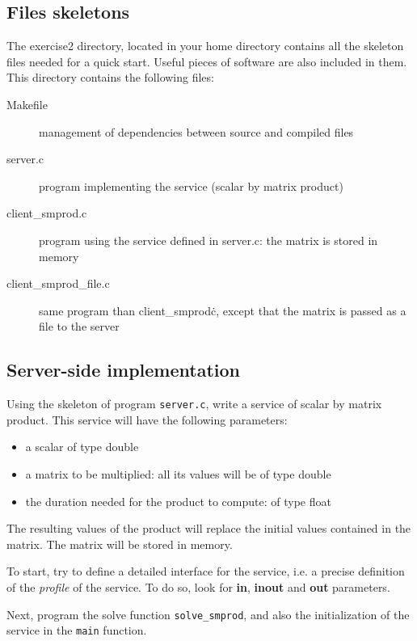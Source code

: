 \documentclass[11pt,a4paper]{article}
\begin{document}
\subsection{Files skeletons}

The exercise2 directory, located in your home directory contains all the skeleton
files needed for a quick start. Useful pieces of software are also included
in them. This directory contains the following files:

\begin{description}
\item[Makefile]{management of dependencies between source and compiled files}
\item[server.c]{program implementing the service (scalar by matrix product)}
\item[client\_smprod.c]{program using the service defined in server.c: the
    matrix is stored in memory}
\item[client\_smprod\_file.c]{same program than client\_smprod\.c, except that
    the matrix is passed as a file to the server}
\end{description}

\subsection{Server-side implementation}

Using the skeleton of program \texttt{server.c}, write a service of scalar by
matrix product. This service will have the following parameters:

\begin{itemize}
\item{a scalar of type double}
\item{a matrix to be multiplied: all its values will be of type double}
\item{the duration needed for the product to compute: of type float}
\end{itemize}

The resulting values of the product will replace the initial values contained
in the matrix. The matrix will be stored in memory. \par

To start, try to define a detailed interface for the service, i.e. a precise
definition of the \emph{profile} of the service. To do so, look for {\bf in},
{\bf inout} and {\bf out} parameters. \par

Next, program the solve function \texttt{solve\_smprod}, and also the
initialization of the service in the \texttt{main} function. \par
\end{document}
